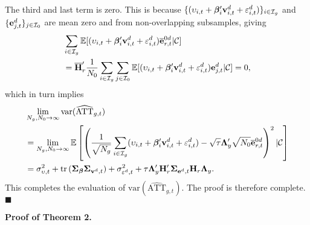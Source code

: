 \documentclass[12pt,fleqn]{article}
\begin{document}
The third and last term is zero. This is because $\{ (\upsilon_{i,t}  + \boldsymbol{\beta}_i'\mathbf{v}_{i,t}^d + \varepsilon_{i,t}^d ) \}_{i\in \mathcal{I}_g}$ and $\{\mathbf{e}_{j,t}^{d}\}_{j\in \mathcal{I}_0}$ are mean zero and from non-overlapping subsamples, giving
\begin{align}
& \sum_{i\in \mathcal{I}_g}\mathbb{E} [ (\upsilon_{i,t}  + \boldsymbol{\beta}_i'\mathbf{v}_{i,t}^d + \varepsilon_{i,t}^d ) \overline{\mathbf{e}}_{r,t}^{0d} |\mathcal{C}] \notag\\
& = \overline{\mathbf{H}}_r'\frac{1}{N_0}\sum_{i\in \mathcal{I}_g}\sum_{j\in \mathcal{I}_0} \mathbb{E} [ (\upsilon_{i,t}  + \boldsymbol{\beta}_i'\mathbf{v}_{i,t}^d + \varepsilon_{i,t}^d ) \mathbf{e}_{j,t}^{d} |\mathcal{C}] = 0,
\end{align}
which in turn implies
\begin{align}
& \lim_{N_g,N_0\to\infty} \mathrm{var}(\widehat{\mathrm{ATT}}_{g,t}) \notag\\
&= \lim_{N_g,N_0\to\infty} \mathbb{E} \left[\left(\frac{1}{\sqrt{N_g}}\sum_{i\in \mathcal{I}_g} (\upsilon_{i,t}  + \boldsymbol{\beta}_i'\mathbf{v}_{i,t}^d + \varepsilon_{i,t}^d ) - \sqrt{\tau}\boldsymbol{\Lambda}_y'\sqrt{N_0}\overline{\mathbf{e}}_{r,t}^{0d} \right)^2 |\mathcal{C}\right] \notag\\
&= \sigma^2_{\upsilon,t}  + \mathrm{tr}\,(\boldsymbol{\Sigma}_{\boldsymbol{\beta}} \boldsymbol{\Sigma}_{\mathbf{v}^d,t}) + \sigma^2_{\varepsilon^d,t}  + \tau  \boldsymbol{\Lambda}_y' \mathbf{H}_r'  \boldsymbol{\Sigma}_{\mathbf{e}^d,t} \mathbf{H}_r \boldsymbol{\Lambda}_y .
\end{align}
This completes the evaluation of $\mathrm{var}(\widehat{\mathrm{ATT}}_{g,t})$. The proof is therefore complete. \hfill{$\blacksquare$}

\bigskip

\noindent\textbf{Proof of Theorem 2.}

\bigskip
\end{document}
